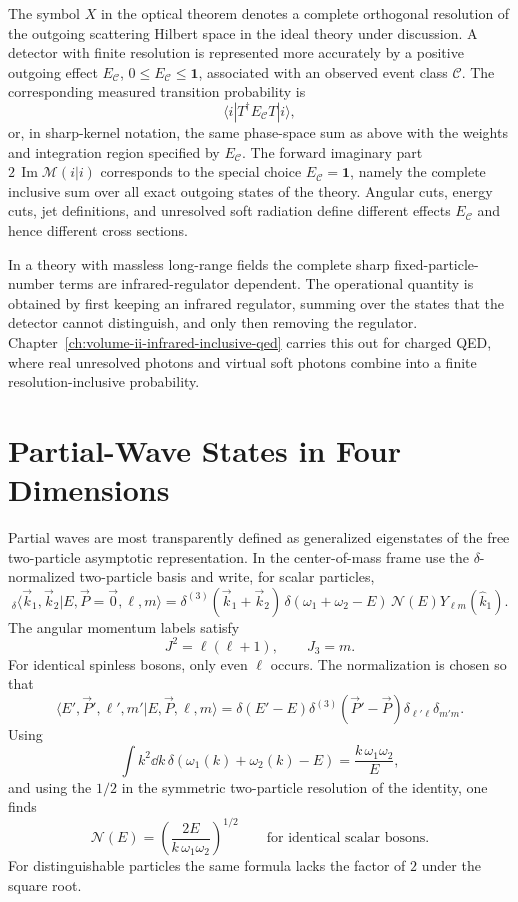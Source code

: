 \begin{remark}
The symbol \(X\) in the optical theorem denotes a complete orthogonal
resolution of the outgoing scattering Hilbert space in the ideal theory under
discussion.  A detector with finite resolution is represented more accurately
by a positive outgoing effect \(E_{\mathcal C}\), \(0\le E_{\mathcal C}\le
\mathbf 1\), associated with an observed event class \(\mathcal C\).  The
corresponding measured transition probability is
\[
  \langle i|T^\dagger E_{\mathcal C}T|i\rangle ,
\]
or, in sharp-kernel notation, the same phase-space sum as above with the
weights and integration region specified by \(E_{\mathcal C}\).  The forward
imaginary part \(2\,\operatorname{Im}\mathcal M(i|i)\) corresponds to the
special choice \(E_{\mathcal C}=\mathbf 1\), namely the complete inclusive sum
over all exact outgoing states of the theory.  Angular cuts, energy cuts, jet
definitions, and unresolved soft radiation define different effects
\(E_{\mathcal C}\) and hence different cross sections.

In a theory with massless long-range fields the complete sharp
fixed-particle-number terms are infrared-regulator dependent.  The operational
quantity is obtained by first keeping an infrared regulator, summing over the
states that the detector cannot distinguish, and only then removing the
regulator.  Chapter~\ref{ch:volume-ii-infrared-inclusive-qed} carries this out
for charged QED, where real unresolved photons and virtual soft photons combine
into a finite resolution-inclusive probability.
\end{remark}

\section{Partial-Wave States in Four Dimensions}

Partial waves are most transparently defined as generalized eigenstates of the
free two-particle asymptotic representation.  In the center-of-mass frame use
the \(\delta\)-normalized two-particle basis and write, for scalar particles,
\[
  {}_\delta\langle \vec k_1,\vec k_2
  |E,\vec P=\vec0,\ell,m\rangle
  =
  \delta^{(3)}(\vec k_1+\vec k_2)\,
  \delta(\omega_1+\omega_2-E)\,
  \mathcal N(E)Y_{\ell m}(\widehat k_1).
\]
The angular momentum labels satisfy
\[
  J^2=\ell(\ell+1),\qquad J_3=m.
\]
For identical spinless bosons, only even \(\ell\) occurs.  The normalization is
chosen so that
\[
  \langle E',\vec P',\ell',m'|E,\vec P,\ell,m\rangle
  =
  \delta(E'-E)\delta^{(3)}(\vec P'-\vec P)
  \delta_{\ell'\ell}\delta_{m'm}.
\]
Using
\[
  \int k^2\dd k\,\delta(\omega_1(k)+\omega_2(k)-E)
  =
  \frac{k\,\omega_1\omega_2}{E},
\]
and using the \(1/2\) in the symmetric two-particle resolution of the identity,
one finds
\[
  \mathcal N(E)
  =
  \left(\frac{2E}{k\,\omega_1\omega_2}\right)^{1/2}
  \qquad\text{for identical scalar bosons}.
\]
For distinguishable particles the same formula lacks the factor of \(2\) under
the square root.

